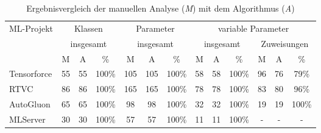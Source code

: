 \documentclass[german,bachelor]{swsLeipzig}
\begin{document}
\begin{table}[H]
\small
\begin{center}
\setlength{\tabcolsep}{5pt}
\begin{tabular}[h]{l|c c|c|c c|c|c c|c|c c|c} %
\hline
\multirow{3}{*}{ML-Projekt} & \multicolumn{3}{c|}{Klassen}      & \multicolumn{3}{c|}{Parameter}    & \multicolumn{6}{c}{variable Parameter}\\
                            & \multicolumn{3}{c|}{insgesamt}    & \multicolumn{3}{c|}{insgesamt}    & \multicolumn{3}{c|}{insgesamt}       & \multicolumn{3}{c}{Zuweisungen} \\
                            & M         & A     & \%            & M         & A     & \%            & M         & A     & \%                & M     & A     & \% \\
\hline \hline
Tensorforce                 & 55        & 55    & 100\%         & 105       & 105   & 100\%         & 58        & 58    & 100\%             & 96    & 76    & 79\% \\
RTVC                        & 86        & 86    & 100\%         & 165       & 165   & 100\%         & 78        & 78    & 100\%             & 83    & 80    & 96\% \\
AutoGluon                   & 65        & 65    & 100\%         & 98        & 98    & 100\%         & 32        & 32    & 100\%             & 19    & 19    & 100\% \\
MLServer                    & 30        & 30    & 100\%         & 57        & 57    & 100\%         & 11        & 11    & 100\%             & -     & -     & -\\
\hline
\end{tabular}
\caption{Ergebnisvergleich der manuellen Analyse (\textit{M}) mit dem Algorithmus (\textit{A})} \label{eval}
\end{center}
\end{table}
\end{document}
